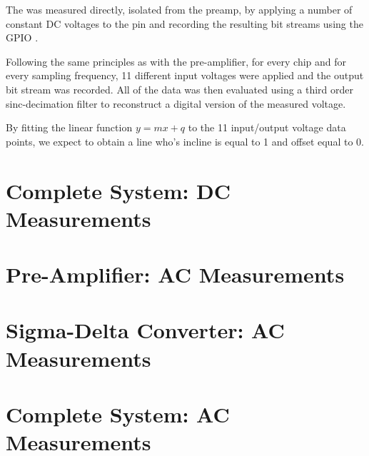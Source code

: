 The \sdm was measured directly, isolated from the preamp, by applying a number
of  constant  DC  voltages  to  the  pin  and  recording  the
resulting bit streams using the GPIO \raspi.

Following  the  same  principles as with the pre-amplifier, for every chip and
for every sampling frequency, 11 different input voltages were applied and the
output bit  stream  was  recorded.  All of the data was then evaluated using a
third order sinc-decimation filter to reconstruct a  digital  version  of  the
measured voltage.

By  fitting the linear function $y=mx+q$ to the 11 input/output  voltage  data
points, we expect  to  obtain  a  line  who's incline is equal to 1 and offset
equal to 0.

\section{Complete System: DC Measurements}
\label{sec:systemDC}

\section{Pre-Amplifier: AC Measurements}
\label{sec:preAmpAC}

\section{Sigma-Delta Converter: AC Measurements}
\label{sec:sigdelAC}

\section{Complete System: AC Measurements}
\label{sec:systemAC}


